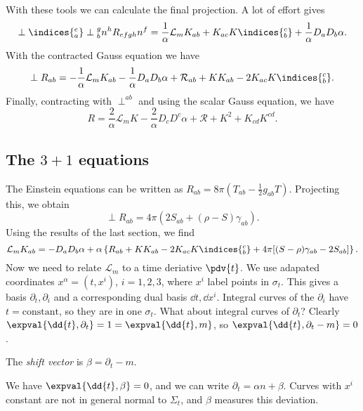 \documentclass{jknotes}
\begin{document}
With these tools we can calculate the final projection. A lot of effort gives
\begin{equation}
    \perp\indices{^e_a}\perp{^g_b}n^hR_{efgh}n^f = \frac1\alpha\mathcal{L}_m K_{ab} + K_{ac}K\indices{^c_b} + \frac1\alpha D_a D_b\alpha.
\end{equation}
With the contracted Gauss equation we have
\begin{equation}
    \perp R_{ab} = -\frac1\alpha\mathcal{L}_mK_{ab} - \frac1\alpha D_aD_b\alpha + \mathcal{R}_{ab} + KK_{ab} - 2K_{ac}K\indices{^c_b}.
\end{equation}
Finally, contracting with \(\perp^{ab}\) and using the scalar Gauss equation, we have
\begin{equation}
    R = \frac2\alpha\mathcal{L}_m K - \frac2\alpha D_cD^c\alpha+\mathcal{R} + K^2 + K_{cd} K^{cd}.
\end{equation}

\subsection{The \texorpdfstring{$3+1$}{3+1} equations}
The Einstein equations can be written as \(R_{ab}=8\pi(T_{ab}-\frac12g_{ab}T)\). Projecting this, we obtain
\begin{equation}
    \perp R_{ab}=4\pi(2S_{ab}+(\rho-S)\gamma_{ab}).
\end{equation}
Using the results of the last section, we find
\begin{equation}
    \mathcal{L}_m K_{ab} = -D_a D_b \alpha + \alpha\left\{R_{ab} + KK_{ab} -2K_{ac}K\indices{^c_b} + 4\pi[(S-\rho)\gamma_{ab}-2S_{ab}]\right\}.
\end{equation}
Now we need to relate \(\mathcal{L}_m\) to a time deriative \(\pdv{t}\). We use adapated coordinates \(x^\alpha = (t,x^i)\), \(i=1,2,3\), where \(x^i\) label points in \(\sigma_t\). This gives a basis \(\partial_t, \partial_i\) and a corresponding dual basis \(\dd{t},\dd{x^i}\). Integral curves of the \(\partial_i\) have \(t=\text{constant}\), so they are in one \(\sigma_t\). What about integral curves of \(\partial_t\)? Clearly \(\expval{\dd{t},\partial_t}=1=\expval{\dd{t},m}\), so \(\expval{\dd{t},\partial_t-m}=0\).
\begin{defn}
    The \emph{shift vector} is \(\beta = \partial_t-m\).
\end{defn}
We have \(\expval{\dd{t},\beta}=0\), and we can write \(\partial_t=\alpha n + \beta\). Curves with \(x^i\) constant are not in general normal to \(\Sigma_t\), and \(\beta\) measures this deviation. 
\end{document}
